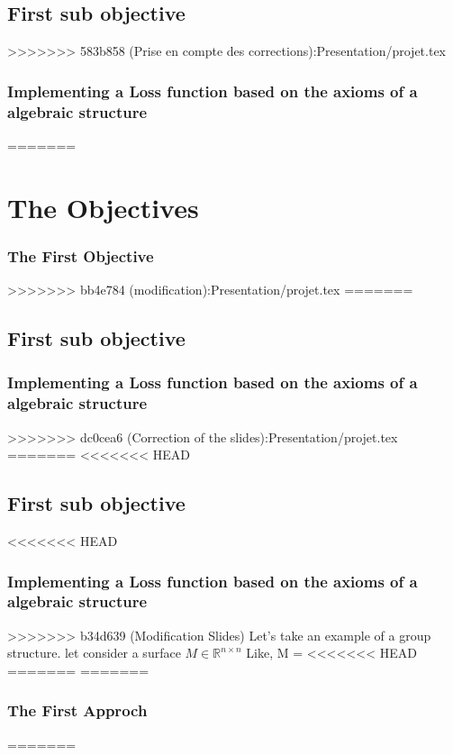 \documentclass{beamer}
\begin{document}
\subsection{First sub objective}
>>>>>>> 583b858 (Prise en compte des corrections):Presentation/projet.tex
\begin{frame}
    \frametitle{Implementing a Loss function based on the axioms of a
    algebraic structure}
=======
\section{The Objectives}
\begin{frame}
        \frametitle{The First Objective}
>>>>>>> bb4e784 (modification):Presentation/projet.tex
=======
\subsection{First sub objective} 
\begin{frame}
    \frametitle{Implementing a Loss function based on the axioms of a
    algebraic structure}
>>>>>>> dc0cea6 (Correction of the slides):Presentation/projet.tex
=======
<<<<<<< HEAD
\subsection{First sub objective}
\begin{frame}
<<<<<<< HEAD
    \frametitle{Implementing a Loss function based on the axioms of a
    algebraic structure}
>>>>>>> b34d639 (Modification Slides)
    Let's take an example of a group structure.
    let consider a surface $M \in \mathbb{R}^{n \times n}$
    Like,
    M =
<<<<<<< HEAD
=======
=======
        \frametitle{The First Approch}
=======


\end{frame}
\end{frame}
\end{frame}
\end{frame}
\end{document}
